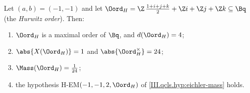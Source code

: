 Let $(a,b)=(-1,-1)$ and let $\Oord_H=\Z\,\tfrac{1+i+j+k}2+\Z i+\Z j+\Z k\subseteq\Bq$ (the \emph{Hurwitz order}). Then:
\begin{enumerate}[label=(\alph*)]
\item $\Oord_H$ is a maximal order of $\Bq$, and $d(\Oord_H)=4$;
\item $\abs{X(\Oord_H)}=1$ and $\abs{\Oord_H^\times}=24$;
\item $\Mass(\Oord_H)=\frac1{24}$;
\item the hypothesis H-EM$(-1,-1,2,\Oord_H)$ of \cref{III.qcls.hyp:eichler-mass} holds.
\end{enumerate}
